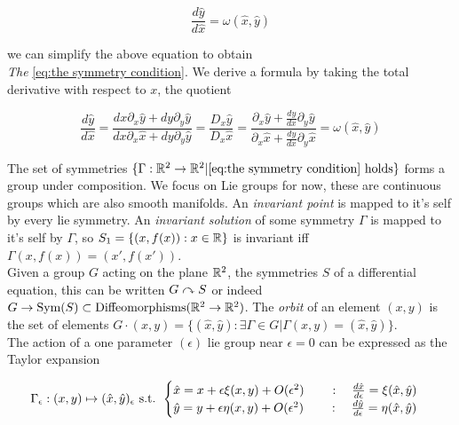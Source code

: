 \documentclass[12pt]{article}
\begin{document}
$$\frac{d\hat y}{d\hat x} = \omega(\hat x,\hat y)$$

we can simplify the above equation to obtain\\

\textit{The } \eqref{eq:the symmetry condition}. We derive a formula by taking the total derivative with respect to $x$, the quotient 

\begin{equation}\label{eq:the symmetry condition}
    \frac{d\hat y}{d\hat x} = \frac{dx \partial_x \hat y + dy \partial_y\hat y}{dx \partial_x \hat x + dy\partial_y \hat y} = \frac{D_x \hat y}{D_x \hat x} = \frac{\partial_x \hat y + \frac{dy}{dx}\partial_y\hat y}{\partial_x \hat x + \frac{dy}{dx}\partial_y\hat x} = \omega(\hat x,\hat y)
\end{equation}

The set of symmetries $\{\Gamma : \mathbb{R}^2\to\mathbb{R}^2 | \eqref{eq:the symmetry condition}\,\,\text{holds} \}$ forms a group under composition. We focus on Lie groups for now, these are continuous groups which are also smooth manifolds. An \textit{invariant point} is mapped to it's self by every lie symmetry. An \textit{invariant solution} of some symmetry $\Gamma$ is mapped to it's self by $\Gamma$, so $S_1 = \{(x,f(x)) : x\in \mathbb{R}\}$ is invariant iff $\Gamma(x,f(x)) = (x' , f( x'))$.  \\

Given a group $G$ acting on the plane $\mathbb{R}^2$, the symmetries $S$ of a differential equation, this can be written $G\curvearrowright S$ or indeed $G\to \text{Sym}(S)\subset \text{Diffeomorphisms}( \mathbb{R}^2\to\mathbb{R}^2 )$. The \textit{orbit} of an element $(x,y)$ is the set of elements $G \cdot (x,y) = \{(\hat x, \hat y) : \exists \Gamma\in G | \Gamma (x,y) = (\hat x,\hat y) \}$. \\

The action of a one parameter $(\epsilon)$ lie group near $\epsilon=0$ can be expressed as the Taylor expansion

\begin{equation}\label{eq:one param lie group taylor}
    \Gamma_\epsilon : (x,y)\mapsto (\hat x,\hat y)_\epsilon\text{ s.t. } \begin{cases}\hat x = x + \epsilon \xi(x,y) + O(\epsilon^2)\qquad : \quad \frac{d\hat x}{d\epsilon} = \xi(\hat x,\hat y) \\ \hat y = y + \epsilon\eta(x,y) + O(\epsilon^2) \qquad :\quad \frac{d\hat y}{d\epsilon} = \eta(\hat x,\hat y) \end{cases}
\end{equation}
\end{document}

